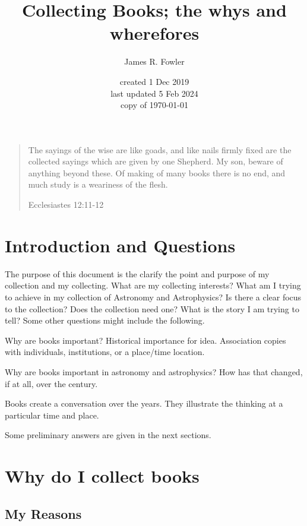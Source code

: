 \documentclass[letterpaper]{article}
\begin{document}
\title{Collecting Books; the whys and wherefores}
\author{James R. Fowler}
\date{created 1 Dec 2019\\ last updated 5 Feb 2024\\ copy of \today}

\maketitle

\begin{quotation}
  The sayings of the wise are like goads, and like nails firmly fixed
  are the collected sayings which are given by one Shepherd.  My son,
  beware of anything beyond these. Of making of many books there is no
  end, and much study is a weariness of the flesh.

  Ecclesiastes 12:11-12
\end{quotation}

\section{Introduction and Questions}

The purpose of this document is the clarify the point and purpose of
my collection and my collecting. What are my collecting interests?
What am I trying to achieve in my collection of  Astronomy and
Astrophysics? Is there a clear focus to the collection? Does the
collection need one? What is the story I am trying to tell? Some other
questions might include the following.

Why are books important? Historical importance for idea. Association
copies with individuals, institutions, or a place/time location.

Why are books important in  astronomy and astrophysics? How
has that changed, if at all, over the century.

Books create a conversation over the years. They illustrate the thinking
at a particular time and place.

Some preliminary answers are given in the next sections.

\section{Why do I collect books}

\subsection{My Reasons}
\end{document}
